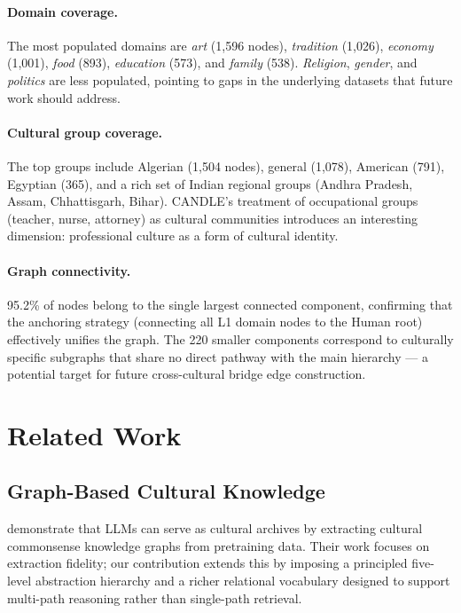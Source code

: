 \documentclass[11pt]{article}
\begin{document}
\paragraph{Domain coverage.}
The most populated domains are \emph{art} (1,596 nodes),
\emph{tradition} (1,026), \emph{economy} (1,001), \emph{food} (893),
\emph{education} (573), and \emph{family} (538).
\emph{Religion}, \emph{gender}, and \emph{politics} are less populated,
pointing to gaps in the underlying datasets that future work should
address.

\paragraph{Cultural group coverage.}
The top groups include Algerian (1,504 nodes), general (1,078), American
(791), Egyptian (365), and a rich set of Indian regional groups (Andhra
Pradesh, Assam, Chhattisgarh, Bihar).
CANDLE's treatment of occupational groups (teacher, nurse, attorney) as
cultural communities introduces an interesting dimension: professional
culture as a form of cultural identity.

\paragraph{Graph connectivity.}
95.2\% of nodes belong to the single largest connected component,
confirming that the anchoring strategy (connecting all L1 domain nodes to
the Human root) effectively unifies the graph.
The 220 smaller components correspond to culturally specific subgraphs
that share no direct pathway with the main hierarchy — a potential target
for future cross-cultural bridge edge construction.

\section{Related Work}
\label{sec:related}

\subsection{Graph-Based Cultural Knowledge}

\citet{tonga2026llms} demonstrate that LLMs can serve as cultural
archives by extracting cultural commonsense knowledge graphs from
pretraining data.
Their work focuses on extraction fidelity; our contribution extends this
by imposing a principled five-level abstraction hierarchy and a richer
relational vocabulary designed to support multi-path reasoning rather than
single-path retrieval.
\end{document}
